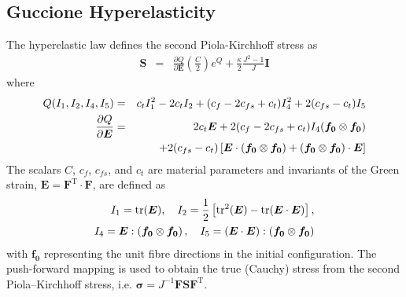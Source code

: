 \documentclass[review,3p]{elsarticle}
\newcommand{\bb}{\boldsymbol}
\begin{document}
\subsection{Guccione Hyperelasticity}
\label{app:mechLaws:GH}
%
The \citet{Guccione1995} hyperelastic law defines the second Piola-Kirchhoff stress as
\begin{eqnarray}
	\boldsymbol{S}
	&=& \frac{\partial Q}{\partial \boldsymbol{E} } \left( \frac{C}{2} \right) e^Q + \frac{\kappa}{2} \frac{J^2 - 1}{J} \textbf{I}
\end{eqnarray}
where
\begin{eqnarray}
	Q(I_1, I_2, I_4, I_5) &=& c_t I_1^2 - 2 c_t I_2 + (c_f - 2c_{fs} + c_t) I_4^2   + 2(c_{fs} - c_t) I_5 \\
	\frac{\partial Q}{\partial \boldsymbol{E} }
	&=&  2 c_t \boldsymbol{E} + 2(c_f - 2 c_{fs} + c_t)I_4 ( \boldsymbol{f_0} \otimes \boldsymbol{f_0} ) \notag \\
	&&+ 2(c_{fs} - c_t)\left[\boldsymbol{E} \cdot  (\boldsymbol{f_0} \otimes \boldsymbol{f_0}) + ( \boldsymbol{f_0} \otimes \boldsymbol{f_0} ) \cdot \boldsymbol{E} \right]
\end{eqnarray}
The scalars $C$, $c_f$, $c_{fs}$, and $c_t$ are material parameters and invariants of the Green strain, $\boldsymbol{E} = \boldsymbol{F}^{\text{T}} \cdot \boldsymbol{F}$, are defined as
\begin{eqnarray}
	I_1 = \text{tr}(\boldsymbol{E}), \quad
	I_2 =  \frac{1}{2} \left[ \text{tr}^2(\boldsymbol{E}) - \text{tr}(\boldsymbol{E} \cdot \boldsymbol{E}) \right], \notag \\
	I_4 = \boldsymbol{E}  : \left( \boldsymbol{f_0} \otimes \boldsymbol{f_0} \right), \quad
	I_5 = \left( \boldsymbol{E} \cdot \boldsymbol{E} \right): \left( \boldsymbol{f_0} \otimes \boldsymbol{f_0} \right)
\end{eqnarray}
with $\boldsymbol{f_0}$ representing the unit fibre directions in the initial configuration.
%
The push-forward mapping is used to obtain the true (Cauchy) stress from the second Piola–Kirchhoff stress, i.e. $\bb{\sigma}=J^{-1}\bb{F}\bb{S}\bb{F}^{\mathrm{T}}$.
\fi
%
\end{document}
